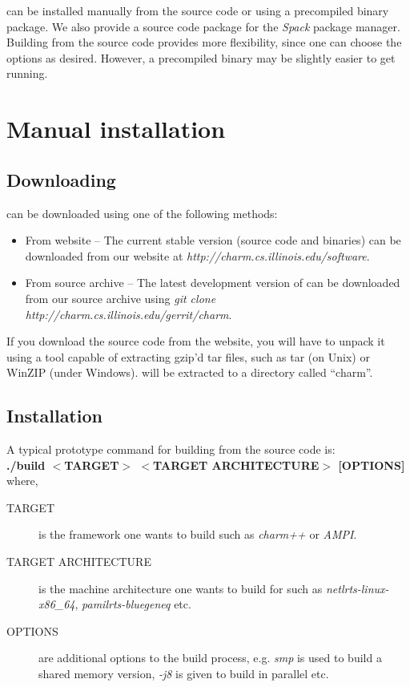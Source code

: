 \charmpp{} can be installed manually from the source code or using a precompiled
binary package. We also provide a source code package for the
\emph{Spack} package manager.
Building from the source code provides more flexibility, since one
can choose the options as desired. However, a precompiled binary may be slightly
easier to get running.


\section{Manual installation}

\subsection{Downloading \charmpp{}}

\charmpp{} can be downloaded using one of the following methods:

\begin{itemize}
\item From \charmpp{} website -- The current stable version (source code and
binaries) can be downloaded from our website at {\em http://charm.cs.illinois.edu/software}.
\item From source archive -- The latest development version of \charmpp{} can be downloaded
from our source archive using {\em git clone http://charm.cs.illinois.edu/gerrit/charm}.
\end{itemize}

If you download the source code from the website, you will have to unpack it
using a tool capable of extracting gzip'd tar files, such as tar (on Unix)
or WinZIP (under Windows).  \charmpp{} will be extracted to a directory
called ``charm''.

\subsection{Installation}
\label{sec:manualinstall}

A typical prototype command for building \charmpp{} from the source code is:
\vspace{5pt}\\
{\bf ./build $<$TARGET$>$ $<$TARGET ARCHITECTURE$>$ [OPTIONS]} where,

\begin{description}
\item [TARGET] is the framework one wants to build such as {\em charm++} or {\em
AMPI}.
\item [TARGET ARCHITECTURE] is the machine architecture one wants to build for
such as {\em netlrts-linux-x86\_64}, {\em pamilrts-bluegeneq} etc.
\item [OPTIONS] are additional options to the build process, e.g. {\em smp} is
used to build a shared memory version, {\em -j8} is given to build in parallel
etc.
\end {description}

